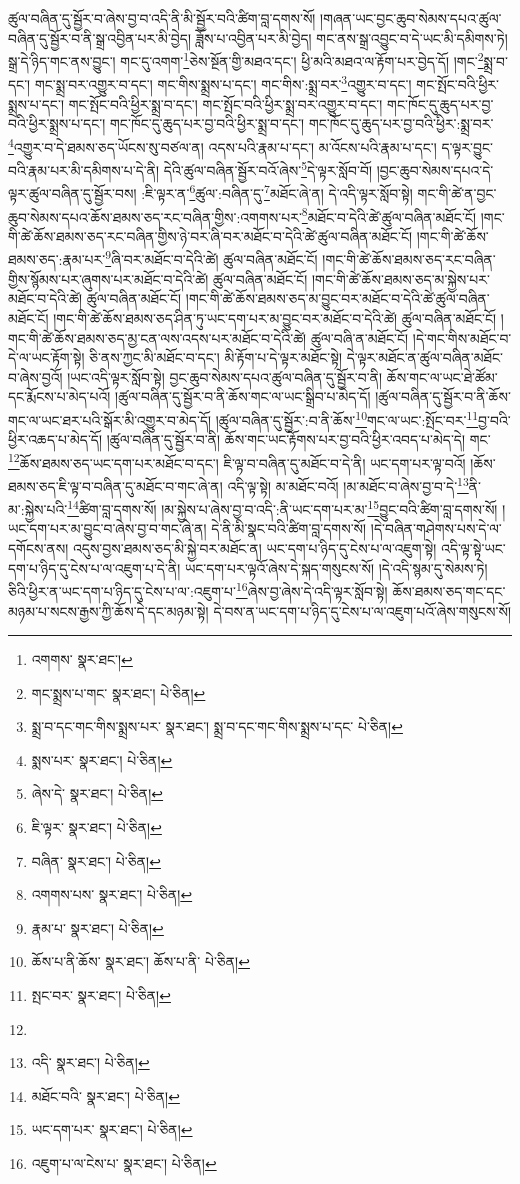 ཚུལ་བཞིན་དུ་སྦྱོར་བ་ཞེས་བྱ་བ་འདི་ནི་མི་སྦྱོར་བའི་ཚིག་བླ་དགས་སོ། །གཞན་ཡང་བྱང་ཆུབ་སེམས་དཔའ་ཚུལ་བཞིན་དུ་སྦྱོར་བ་ནི་སྒྲ་འབྱིན་པར་མི་བྱེད། ཟློས་པ་འབྱིན་པར་མི་བྱེད། གང་ནས་སྒྲ་འབྱུང་བ་དེ་ཡང་མི་དམིགས་ཏེ། སྒྲ་དེ་ཉིད་གང་ནས་བྱུང་། གང་དུ་འགག་\footnote{འགགས་  སྣར་ཐང་། }ཅེས་སྔོན་གྱི་མཐའ་དང་། ཕྱི་མའི་མཐའ་ལ་རྟོག་པར་བྱེད་དོ། །གང་\footnote{གང་སྨྲས་པ་གང་  སྣར་ཐང་།  པེ་ཅིན། }སྨྲ་བ་དང་། གང་སྨྲ་བར་འགྱུར་བ་དང་། གང་གིས་སྨྲས་པ་དང་། གང་གིས་:སྨྲ་བར་\footnote{སྨྲ་བ་དང་གང་གིས་སྨྲས་པར་  སྣར་ཐང་། སྨྲ་བ་དང་གང་གིས་སྨྲས་པ་དང་  པེ་ཅིན། }འགྱུར་བ་དང་། གང་སྤོང་བའི་ཕྱིར་སྨྲས་པ་དང་། གང་སྤོང་བའི་ཕྱིར་སྨྲ་བ་དང་། གང་སྤོང་བའི་ཕྱིར་སྨྲ་བར་འགྱུར་བ་དང་། གང་ཁོང་དུ་ཆུད་པར་བྱ་བའི་ཕྱིར་སྨྲས་པ་དང་། གང་ཁོང་དུ་ཆུད་པར་བྱ་བའི་ཕྱིར་སྨྲ་བ་དང་། གང་ཁོང་དུ་ཆུད་པར་བྱ་བའི་ཕྱིར་:སྨྲ་བར་\footnote{སྨས་པར་  སྣར་ཐང་།  པེ་ཅིན། }འགྱུར་བ་དེ་ཐམས་ཅད་ཡོངས་སུ་བཙལ་ན། འདས་པའི་རྣམ་པ་དང་། མ་འོངས་པའི་རྣམ་པ་དང་། ད་ལྟར་བྱུང་བའི་རྣམ་པར་མི་དམིགས་པ་དེ་ནི། དེའི་ཚུལ་བཞིན་སྦྱོར་བའོ་ཞེས་\footnote{ཞེས་དེ་  སྣར་ཐང་།  པེ་ཅིན། }དེ་ལྟར་སློབ་བོ། །བྱང་ཆུབ་སེམས་དཔའ་དེ་ལྟར་ཚུལ་བཞིན་དུ་སྦྱོར་བས། :ཇི་ལྟར་ན་\footnote{ཇི་ལྟར་  སྣར་ཐང་།  པེ་ཅིན། }ཚུལ་:བཞིན་དུ་\footnote{བཞིན་  སྣར་ཐང་།  པེ་ཅིན། }མཐོང་ཞེ་ན། དེ་འདི་ལྟར་སློབ་སྟེ། གང་གི་ཚེ་ན་བྱང་ཆུབ་སེམས་དཔའ་ཆོས་ཐམས་ཅད་རང་བཞིན་གྱིས་:འགགས་པར་\footnote{འགགས་པས་  སྣར་ཐང་།  པེ་ཅིན། }མཐོང་བ་དེའི་ཚེ་ཚུལ་བཞིན་མཐོང་ངོ། །གང་གི་ཚེ་ཆོས་ཐམས་ཅད་རང་བཞིན་གྱིས་ཉེ་བར་ཞི་བར་མཐོང་བ་དེའི་ཚེ་ཚུལ་བཞིན་མཐོང་ངོ། །གང་གི་ཚེ་ཆོས་ཐམས་ཅད་:རྣམ་པར་\footnote{རྣམ་པ་  སྣར་ཐང་།  པེ་ཅིན། }ཞི་བར་མཐོང་བ་དེའི་ཚེ། ཚུལ་བཞིན་མཐོང་ངོ། །གང་གི་ཚེ་ཆོས་ཐམས་ཅད་རང་བཞིན་གྱིས་སྙོམས་པར་ཞུགས་པར་མཐོང་བ་དེའི་ཚེ། ཚུལ་བཞིན་མཐོང་ངོ། །གང་གི་ཚེ་ཆོས་ཐམས་ཅད་མ་སྐྱེས་པར་མཐོང་བ་དེའི་ཚེ། ཚུལ་བཞིན་མཐོང་ངོ། །གང་གི་ཚེ་ཆོས་ཐམས་ཅད་མ་བྱུང་བར་མཐོང་བ་དེའི་ཚེ་ཚུལ་བཞིན་མཐོང་ངོ། །གང་གི་ཚེ་ཆོས་ཐམས་ཅད་ཤིན་ཏུ་ཡང་དག་པར་མ་བྱུང་བར་མཐོང་བ་དེའི་ཚེ། ཚུལ་བཞིན་མཐོང་ངོ། །གང་གི་ཚེ་ཆོས་ཐམས་ཅད་མྱ་ངན་ལས་འདས་པར་མཐོང་བ་དེའི་ཚེ། ཚུལ་བཞི་ན་མཐོང་ངོ། །དེ་གང་གིས་མཐོང་བ་དེ་ལ་ཡང་རྟོག་སྟེ། ཅི་ནས་ཀྱང་མི་མཐོང་བ་དང་། མི་རྟོག་པ་དེ་ལྟར་མཐོང་སྟེ། དེ་ལྟར་མཐོང་ན་ཚུལ་བཞིན་མཐོང་བ་ཞེས་བྱའོ། །ཡང་འདི་ལྟར་སློབ་སྟེ། བྱང་ཆུབ་སེམས་དཔའ་ཚུལ་བཞིན་དུ་སྦྱོར་བ་ནི། ཆོས་གང་ལ་ཡང་ཐེ་ཚོམ་དང་རྨོངས་པ་མེད་པའོ། །ཚུལ་བཞིན་དུ་སྦྱོར་བ་ནི་ཆོས་གང་ལ་ཡང་སྒྲིབ་པ་མེད་དོ། །ཚུལ་བཞིན་དུ་སྦྱོར་བ་ནི་ཆོས་གང་ལ་ཡང་ཐར་པའི་སྒོར་མི་འགྱུར་བ་མེད་དོ། །ཚུལ་བཞིན་དུ་སྦྱོར་:བ་ནི་ཆོས་\footnote{ཆོས་པ་ནི་ཆོས་  སྣར་ཐང་། ཆོས་པ་ནི་  པེ་ཅིན། }གང་ལ་ཡང་:སྤོང་བར་\footnote{སྤང་བར་  སྣར་ཐང་།  པེ་ཅིན། }བྱ་བའི་ཕྱིར་འཆད་པ་མེད་དོ། །ཚུལ་བཞིན་དུ་སྦྱོར་བ་ནི། ཆོས་གང་ཡང་རྟོགས་པར་བྱ་བའི་ཕྱིར་འབད་པ་མེད་དེ། གང་\footnote{}ཆོས་ཐམས་ཅད་ཡང་དག་པར་མཐོང་བ་དང་། ཇི་ལྟ་བ་བཞིན་དུ་མཐོང་བ་དེ་ནི། ཡང་དག་པར་ལྟ་བའོ། །ཆོས་ཐམས་ཅད་ཇི་ལྟ་བ་བཞིན་དུ་མཐོང་བ་གང་ཞེ་ན། འདི་ལྟ་སྟེ། མ་མཐོང་བའོ། །མ་མཐོང་བ་ཞེས་བྱ་བ་དེ་\footnote{འདི་  སྣར་ཐང་།  པེ་ཅིན། }ནི་མ་:སྐྱེས་པའི་\footnote{མཐོང་བའི་  སྣར་ཐང་།  པེ་ཅིན། }ཚིག་བླ་དགས་སོ། །མ་སྐྱེས་པ་ཞེས་བྱ་བ་འདི་:ནི་ཡང་དག་པར་མ་\footnote{ཡང་དག་པར་  སྣར་ཐང་།  པེ་ཅིན། }བྱུང་བའི་ཚིག་བླ་དགས་སོ། །ཡང་དག་པར་མ་བྱུང་བ་ཞེས་བྱ་བ་གང་ཞེ་ན། དེ་ནི་མི་སྣང་བའི་ཚིག་བླ་དགས་སོ། །དེ་བཞིན་གཤེགས་པས་དེ་ལ་དགོངས་ནས། འདུས་བྱས་ཐམས་ཅད་མི་སྐྱེ་བར་མཐོང་ན། ཡང་དག་པ་ཉིད་དུ་ངེས་པ་ལ་འཇུག་སྟེ། འདི་ལྟ་སྟེ་ཡང་དག་པ་ཉིད་དུ་ངེས་པ་ལ་འཇུག་པ་དེ་ནི། ཡང་དག་པར་ལྟའོ་ཞེས་དེ་སྐད་གསུངས་སོ། །དེ་འདི་སྙམ་དུ་སེམས་ཏེ། ཅིའི་ཕྱིར་ན་ཡང་དག་པ་ཉིད་དུ་ངེས་པ་ལ་:འཇུག་པ་\footnote{འཇུག་པ་ལ་ངེས་པ་  སྣར་ཐང་།  པེ་ཅིན། }ཞེས་བྱ་ཞེས་དེ་འདི་ལྟར་སློབ་སྟེ། ཆོས་ཐམས་ཅད་གང་དང་མཉམ་པ་སངས་རྒྱས་ཀྱི་ཆོས་དེ་དང་མཉམ་སྟེ། དེ་བས་ན་ཡང་དག་པ་ཉིད་དུ་ངེས་པ་ལ་འཇུག་པའོ་ཞེས་གསུངས་སོ། 